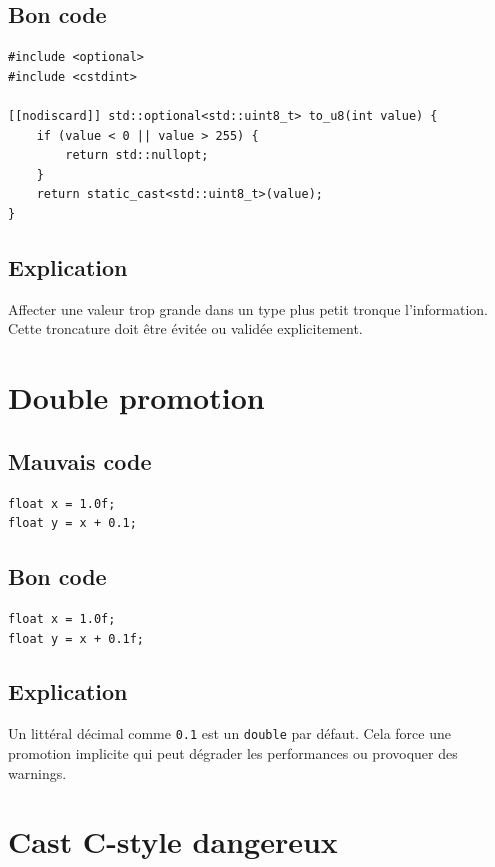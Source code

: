 \documentclass[a4paper,11pt]{report}
\begin{document}
\section{Bon code}
\begin{lstlisting}
#include <optional>
#include <cstdint>

[[nodiscard]] std::optional<std::uint8_t> to_u8(int value) {
    if (value < 0 || value > 255) {
        return std::nullopt;
    }
    return static_cast<std::uint8_t>(value);
}
\end{lstlisting}

\section{Explication}
Affecter une valeur trop grande dans un type plus petit tronque l'information.
Cette troncature doit être évitée ou validée explicitement.

\chapter{Double promotion}

\section{Mauvais code}
\begin{lstlisting}
float x = 1.0f;
float y = x + 0.1;
\end{lstlisting}

\section{Bon code}
\begin{lstlisting}
float x = 1.0f;
float y = x + 0.1f;
\end{lstlisting}

\section{Explication}
Un littéral décimal comme \texttt{0.1} est un \texttt{double} par défaut.
Cela force une promotion implicite qui peut dégrader les performances ou provoquer des warnings.

\chapter{Cast C-style dangereux}
\end{document}
